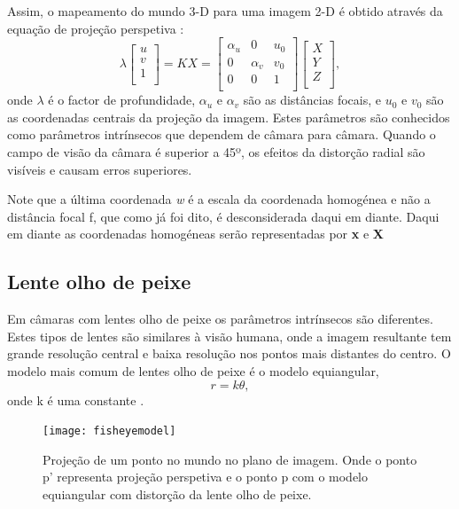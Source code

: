 Assim, o mapeamento do mundo 3-D para uma imagem 2-D é obtido através da equação de projeção perspetiva :
\[  \textbf{$\lambda$} \left[ \begin{array}{c} u\\v\\1\\ \end{array} \right] = 
KX = \left[ \begin{array}{ccc} \alpha_u  & 0 & \textit{u}_0 \\ 
0 & \alpha_v & \textit{v}_0 \\ 
0 & 0 & 1 \\
\end{array} \right] \left[ \begin{array}{c} X \\ 
Y \\ 
Z \\ 
\end{array} \right], \]
onde $\lambda$ é o factor de profundidade, $\alpha_u$ e $\alpha_v$ são as distâncias focais, e $\textit{u}_0$ e $\textit{v}_0$ são as coordenadas centrais da projeção da imagem. Estes parâmetros são conhecidos como parâmetros intrínsecos que dependem de câmara para câmara. Quando o campo de visão da câmara é superior a 45º, os efeitos da distorção radial são visíveis e causam erros superiores.

Note que a última coordenada \textit{w} é a escala da coordenada homogénea e não a distância focal f, que como já foi dito, é desconsiderada daqui em diante. Daqui em diante as coordenadas homogéneas serão representadas por \textbf{x} e \textbf{X} 


\subsection{Lente olho de peixe}

Em câmaras com lentes olho de peixe os parâmetros intrínsecos são diferentes. Estes tipos de lentes são similares à visão humana, onde a imagem resultante tem grande resolução central e baixa resolução nos pontos mais distantes do centro. O modelo mais comum de lentes olho de peixe é o modelo equiangular,  \[ r = k \theta,  \] onde k é uma constante \cite{Hansen2009}.

\begin{figure}[h!] %
	\begin{center}
		\leavevmode		
		\texttt{[image: fisheyemodel]}
		\caption{Projeção de um ponto no mundo no plano de imagem. Onde o ponto p' representa projeção perspetiva e o ponto p com o modelo equiangular com distorção da lente olho de peixe. \cite{Srestasathiern2014,Kannala2004}}
		\label{fig:fishvspinhole} 
	\end{center}
\end{figure}

